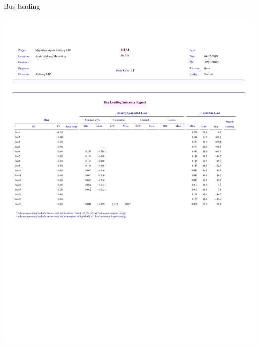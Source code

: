 \begin{table}[]
	\caption{Bus loading}
	\label{tbl_ch04_elecaudit_load_flow_analysis02}
	\includegraphics[width=\textwidth]{tables/tbl_ch04_elecaudit_load_flow_analysis02.pdf}		
\end{table}


